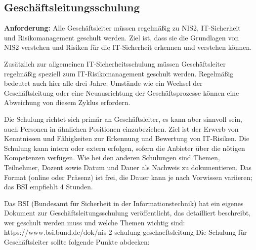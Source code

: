 \newpage
\subsection{Geschäftsleitungsschulung}

\textbf{Anforderung:} Alle Geschäftsleiter müssen regelmäßig zu NIS2, IT-Sicherheit und Risikomanagement geschult werden. Ziel ist, dass sie die Grundlagen von NIS2 verstehen und Risiken für die IT-Sicherheit erkennen und verstehen können.

Zusätzlich zur allgemeinen IT-Sicherheitsschulung müssen Geschäftsleiter regelmäßig speziell zum IT-Risikomanagement geschult werden. Regelmäßig bedeutet auch hier alle drei Jahre. Umstände wie ein Wechsel der Geschäftsleitung oder eine Neuausrichtung der Geschäftsprozesse können eine Abweichung von diesem Zyklus erfordern.

Die Schulung richtet sich primär an Geschäftsleiter, es kann aber sinnvoll sein, auch Personen in ähnlichen Positionen einzubeziehen. Ziel ist der Erwerb von Kenntnissen und Fähigkeiten zur Erkennung und Bewertung von IT-Risiken. Die Schulung kann intern oder extern erfolgen, sofern die Anbieter über die nötigen Kompetenzen verfügen. Wie bei den anderen Schulungen sind Themen, Teilnehmer, Dozent sowie Datum und Dauer als Nachweis zu dokumentieren. Das Format (online oder Präsenz) ist frei, die Dauer kann je nach Vorwissen variieren; das BSI empfiehlt 4 Stunden.

Das BSI (Bundesamt für Sicherheit in der Informationstechnik) hat ein eigenes Dokument zur Geschäftsleitungsschulung veröffentlicht, das detailliert beschreibt, wer geschult werden muss und welche Themen wichtig sind: https://www.bsi.bund.de/dok/nis-2-schulung-geschaeftsleitung
\newpage
Die Schulung für Geschäftsleiter sollte folgende Punkte abdecken:

